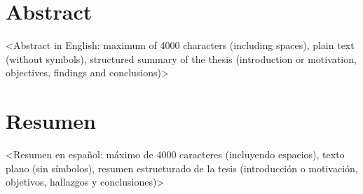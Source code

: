 %

\chapter*{Abstract}
\label{sec::abstract}

<Abstract in English: maximum of 4000 characters (including spaces), plain text (without symbols), structured summary of the thesis (introduction or motivation, objectives, findings and conclusions)>


\newpage
\chapter*{Resumen}
\label{sec::resumen}


<Resumen en español: máximo de 4000 caracteres (incluyendo espacios), texto plano (sin símbolos), resumen estructurado de la tesis (introducción o motivación, objetivos, hallazgos y conclusiones)>

